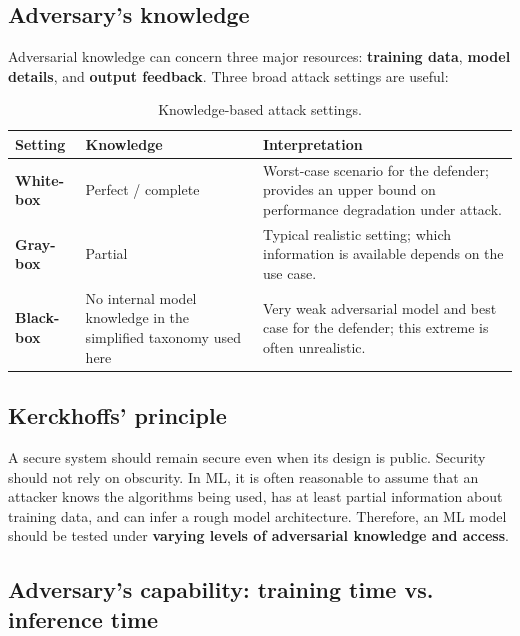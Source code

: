 \documentclass[11pt,a4paper]{report}
\begin{document}
\subsection{Adversary's knowledge}

Adversarial knowledge can concern three major resources: \textbf{training data}, \textbf{model details}, and \textbf{output feedback}. Three broad attack settings are useful:

\begin{table}[H]
\centering
\caption{Knowledge-based attack settings.}
\label{tab:attack-knowledge}
\begin{tabularx}{\textwidth}{>{\bfseries}p{}p{}X}
\toprule
\rowcolor{Primary}
\color{white}Setting & \color{white}Knowledge & \color{white}Interpretation \\
\midrule
White-box & Perfect / complete & Worst-case scenario for the defender; provides an upper bound on performance degradation under attack. \\
Gray-box & Partial & Typical realistic setting; which information is available depends on the use case. \\
Black-box & No internal model knowledge in the simplified taxonomy used here & Very weak adversarial model and best case for the defender; this extreme is often unrealistic. \\
\bottomrule
\end{tabularx}
\end{table}

\subsection{Kerckhoffs' principle}

\begin{keybox}[title={``The enemy knows the system''}]
A secure system should remain secure even when its design is public. Security should not rely on obscurity. In ML, it is often reasonable to assume that an attacker knows the algorithms being used, has at least partial information about training data, and can infer a rough model architecture. Therefore, an ML model should be tested under \textbf{varying levels of adversarial knowledge and access}.
\end{keybox}

\subsection{Adversary's capability: training time vs. inference time}
\end{document}
